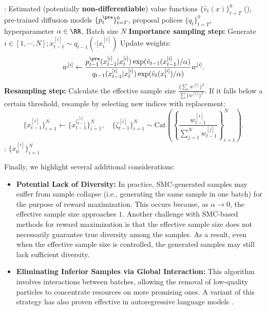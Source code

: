 \begin{algorithm}[!th]
\caption{SMC-Based Guidance (e.g.,  \citet{wu2024practical,dou2024diffusion,cardoso2023monte,phillips2024particle})}\label{alg:SMC}
\begin{algorithmic}[1]
     : Estimated (potentially \textbf{non-differentiable}) value functions $\{\hat v_t(x)\}_{t=T}^0$ (), pre-trained diffusion models $\{p^{\pre}_t\}_{t=T}^0$, proposal polices $\{q_t\}_{t=T}^0$, hyperparameter $\alpha \in \RR$, Batch size $N$
       \STATE \textbf{Importance sampling step:}  \label{line:IS} 
Generate $i \in [1,\cdots, N]; x^{[i]}_{t-1} \sim q_{t-1}(\cdot| x^{[i]}_{t})$
       \STATE Update weights:
       \begin{align*}
          w^{[i]} \leftarrow  \frac{ p^{\pre}_{t-1}(x^{[i]}_{t-1}|x^{[i]}_{t} )\exp(\hat v_{t-1}(x^{[i]}_{t-1})/\alpha) }{q_{t-1}(x^{[i]}_{t-1}|x^{[i]}_{t} )\exp(\hat v_t(x^{[i]}_{t})/\alpha)  }w^{[i]}.  
       \end{align*} 
        \STATE \textbf{Resampling step:} Calculate the effective sample size $
            \frac{\{\sum_i w^{[i]} \} ^2  }{\sum \{ w^{[i]}\}^2}.$
        If it falls below a certain threshold, resample by selecting new indices with replacement:  \\ 
       $$\{x^{[i]}_{t-1}\}_{i=1}^N  \leftarrow \{x^{\zeta^{[i]}_{t-1}}_{t-1}\}_{i=1}^N,\quad \{\zeta^{[i]}_{t-1}\}_{i=1}^N \sim \mathrm{Cat}\left ( \left \{\frac{w^{[i]}_{t-1}}{\sum_{j=1}^N w^{[j]}_{t-1} } \right \}_{i=1}^N\right).$$\label{line:selection}
     \ENDFOR
  : $\{ x^{[i]}_0\}_{i=1}^N$
\end{algorithmic}
\end{algorithm} 


Finally, we highlight several additional considerations:
\begin{itemize} 
\item \textbf{Potential Lack of Diversity:} In practice, SMC-generated samples may suffer from sample collapse (i.e., generating the same sample in one batch) for the purpose of reward maximization. This occurs because, as $\alpha \to 0$, the effective sample size approaches $1$. Another challenge with SMC-based methods for reward maximization is that the effective sample size does not necessarily guarantee true diversity among the samples. As a result, even when the effective sample size is controlled, the generated samples may still lack sufficient diversity.
\item \textbf{Eliminating Inferior Samples via Global Interaction:} This algorithm involves interactions between batches, allowing the removal of low-quality particles to concentrate resources on more promising ones. A variant of this strategy has also proven effective in autoregressive language models \citep{zhang2024accelerating}. 
\end{itemize}

